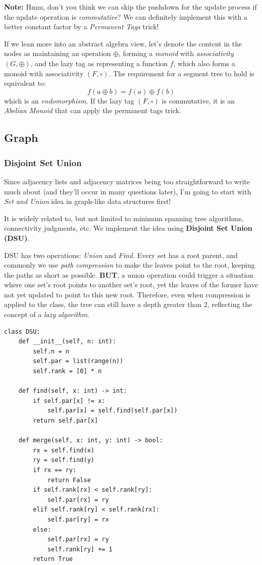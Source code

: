 \documentclass{article}
\begin{document}
\textbf{Note:} Hmm, don't you think we can skip the pushdown for the update process if the update operation is \emph{commutative}? We can definitely implement this with a better constant factor by a \emph{Permanent Tags} trick!

If we lean more into an abstract algebra view, let's denote the content in the nodes as maintaining an operation $\oplus$, forming a \emph{monoid} with \emph{associativity} $(G, \oplus)$, and the lazy tag as representing a function $f$, which also forms a monoid with associativity $(F, \circ)$. The requirement for a segment tree to hold is equivalent to:$$f(a\oplus b)=f(a)\oplus f(b)$$which is an \emph{endomorphism}. If the lazy tag $(F,\circ)$ is commutative, it is an \emph{Abelian Monoid} that can apply the permanent tags trick.


\subsection{Graph}

\subsubsection{Disjoint Set Union}

Since adjacency lists and adjacency matrices being too straightforward to write much about (and they'll occur in many questions later), I'm going to start with \emph{Set and Union} idea in graph-like data structures first!

It is widely related to, but not limited to minimum spanning tree algorithms, connectivity judgments, etc. We implement the idea using \textbf{Disjoint Set Union (DSU)}.

DSU has two operations: \emph{Union} and \emph{Find}. Every set has a root parent, and commonly we use \emph{path compression} to make the leaves point to the root, keeping the paths as short as possible. \textbf{BUT}, a union operation could trigger a situation where one set's root points to another set's root, yet the leaves of the former have not yet updated to point to this new root. Therefore, even when compression is applied to the class, the tree can still have a depth greater than 2, reflecting the concept of a \emph{lazy algorithm}.

\newpage

\begin{lstlisting}[style=python]
class DSU:
    def __init__(self, n: int):
        self.n = n
        self.par = list(range(n))
        self.rank = [0] * n

    def find(self, x: int) -> int:
        if self.par[x] != x:
            self.par[x] = self.find(self.par[x])
        return self.par[x]

    def merge(self, x: int, y: int) -> bool:
        rx = self.find(x)
        ry = self.find(y)
        if rx == ry:
            return False
        if self.rank[rx] < self.rank[ry]:
            self.par[rx] = ry
        elif self.rank[ry] < self.rank[rx]:
            self.par[ry] = rx
        else:
            self.par[rx] = ry
            self.rank[ry] += 1
        return True
\end{lstlisting}
\end{document}
